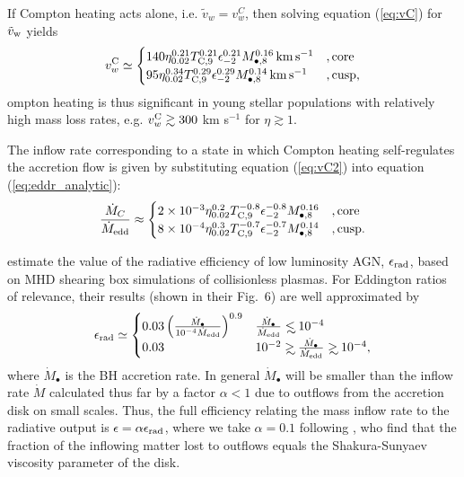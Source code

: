 \documentclass[usenatbib,fleqn]{mn2e}
\newcommand\lsim{\mathrel{\rlap{\lower4pt\hbox{\hskip1pt$\sim$}}
    \raise1pt\hbox{$<$}}}
\newcommand\gsim{\mathrel{\rlap{\lower4pt\hbox{\hskip1pt$\sim$}}
    \raise1pt\hbox{$>$}}}
\begin{document}
If Compton heating acts alone, i.e. $\tilde{v}_{w} = v_{w}^{C}$, then
solving equation (\ref{eq:vC}) for $\tilde{v}_{\rm w}$ yields
\begin{align} v_{w}^{\rm C} \simeq
  \begin{cases} 140 \eta_{0.02}^{0.21}T_{\rm
C,9}^{0.21}\epsilon_{-2}^{0.21} M_{\bullet,8}^{0.16}\,{\rm km\,s^{-1}}
&, \text{core}\\ 95 \eta_{0.02}^{0.34}T_{\rm
C,9}^{0.29}\epsilon_{-2}^{0.29} M_{\bullet,8}^{0.14}\,{\rm km\,s^{-1}}
&, \text{cusp},
  \end{cases}
  \label{eq:vC2}
\end{align} 
ompton heating is thus significant in young stellar populations
with relatively high mass loss rates, e.g. $v_{w}^{\rm C} \gtrsim 300$
km s$^{-1}$ for $\eta \gtrsim 1$.  

The inflow rate corresponding to a state in which Compton heating
self-regulates the accretion flow is given by substituting equation
(\ref{eq:vC2}) into equation (\ref{eq:eddr_analytic}):
\begin{align}
\frac{\dot{M}_{C}}{\dot{M}_{\rm edd}} \approx 
\begin{cases} 2\times 10^{-3} \eta_{0.02}^{0.2}T_{\rm
C,9}^{-0.8}\epsilon_{-2}^{-0.8} M_{\bullet,8}^{0.16}
&, \text{core}\\ 8\times 10^{-4} \eta_{0.02}^{0.3}T_{\rm
C,9}^{-0.7}\epsilon_{-2}^{-0.7} M_{\bullet,8}^{0.14}
&, \text{cusp}.
  \end{cases}
  \label{eq:MdotCa}
\end{align}

\citet{Sharma+2007} estimate the value of the radiative efficiency of
low luminosity AGN, $\epsilon_{\rm rad}$, based on MHD shearing box
simulations of collisionless plasmas.  For Eddington ratios of
relevance, their results (shown in their Fig.~6) are well approximated
by
\begin{align}
\epsilon_{\rm rad} \simeq 
\begin{cases}
  0.03 \left(\frac{\dot{M}_{\bullet}}{10^{-4}\dot{M}_{\rm edd}}\right)^{0.9} & \frac{\dot{M}_{\bullet}}{\dot{M}_{\rm edd}} \lsim 10^{-4} \\
 0.03 &  10^{-2} \gsim \frac{\dot{M}_{\bullet}}{\dot{M}_{\rm edd}} \gsim  10^{-4},
\end{cases}
\label{eq:efficiency}
\end{align}
where $\dot{M}_{\bullet}$ is the BH accretion rate. In general
$\dot{M}_{\bullet}$ will be smaller than the inflow rate $\dot{M}$
calculated thus far by a factor $\alpha < 1$ due to outflows from the
accretion disk on small scales.  Thus, the full efficiency relating
the mass inflow rate to the radiative output is $\epsilon = \alpha
\epsilon_{\rm rad}$, where we take $\alpha = 0.1$ following
\citet{Li+2013}, who find that the fraction of the inflowing matter
lost to outflows equals the Shakura-Sunyaev viscosity parameter of the
disk.
\end{document}
